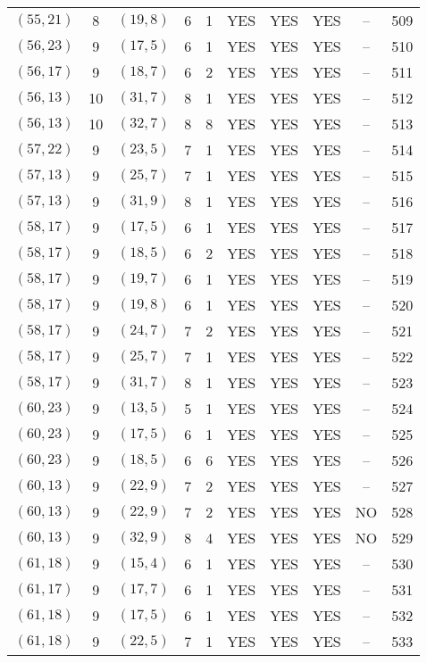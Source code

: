 \begin{longtable}{|c|c|c|c|c|c|c|c|c|c|}
$(55, 21)$ & 8 & $(19, 8)$ & 6 & 1 & YES & YES & YES & -- & 509\\
$(56, 23)$ & 9 & $(17, 5)$ & 6 & 1 & YES & YES & YES & -- & 510\\
$(56, 17)$ & 9 & $(18, 7)$ & 6 & 2 & YES & YES & YES & -- & 511\\
$(56, 13)$ & 10 & $(31, 7)$ & 8 & 1 & YES & YES & YES & -- & 512\\
$(56, 13)$ & 10 & $(32, 7)$ & 8 & 8 & YES & YES & YES & -- & 513\\
$(57, 22)$ & 9 & $(23, 5)$ & 7 & 1 & YES & YES & YES & -- & 514\\
$(57, 13)$ & 9 & $(25, 7)$ & 7 & 1 & YES & YES & YES & -- & 515\\
$(57, 13)$ & 9 & $(31, 9)$ & 8 & 1 & YES & YES & YES & -- & 516\\
$(58, 17)$ & 9 & $(17, 5)$ & 6 & 1 & YES & YES & YES & -- & 517\\
$(58, 17)$ & 9 & $(18, 5)$ & 6 & 2 & YES & YES & YES & -- & 518\\
$(58, 17)$ & 9 & $(19, 7)$ & 6 & 1 & YES & YES & YES & -- & 519\\
$(58, 17)$ & 9 & $(19, 8)$ & 6 & 1 & YES & YES & YES & -- & 520\\
$(58, 17)$ & 9 & $(24, 7)$ & 7 & 2 & YES & YES & YES & -- & 521\\
$(58, 17)$ & 9 & $(25, 7)$ & 7 & 1 & YES & YES & YES & -- & 522\\
$(58, 17)$ & 9 & $(31, 7)$ & 8 & 1 & YES & YES & YES & -- & 523\\
$(60, 23)$ & 9 & $(13, 5)$ & 5 & 1 & YES & YES & YES & -- & 524\\
$(60, 23)$ & 9 & $(17, 5)$ & 6 & 1 & YES & YES & YES & -- & 525\\
$(60, 23)$ & 9 & $(18, 5)$ & 6 & 6 & YES & YES & YES & -- & 526\\
$(60, 13)$ & 9 & $(22, 9)$ & 7 & 2 & YES & YES & YES & -- & 527\\
$(60, 13)$ & 9 & $(22, 9)$ & 7 & 2 & YES & YES & YES & NO & 528\\
$(60, 13)$ & 9 & $(32, 9)$ & 8 & 4 & YES & YES & YES & NO & 529\\
$(61, 18)$ & 9 & $(15, 4)$ & 6 & 1 & YES & YES & YES & -- & 530\\
$(61, 17)$ & 9 & $(17, 7)$ & 6 & 1 & YES & YES & YES & -- & 531\\
$(61, 18)$ & 9 & $(17, 5)$ & 6 & 1 & YES & YES & YES & -- & 532\\
$(61, 18)$ & 9 & $(22, 5)$ & 7 & 1 & YES & YES & YES & -- & 533\\

\end{longtable}
